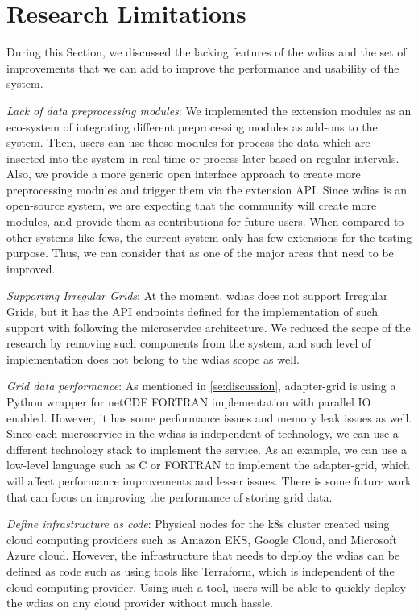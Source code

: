 \section{Research Limitations}
\label{se:research_limitations}

During this Section, we discussed the lacking features of the \acrshort{wdias} and the set of improvements that we can add to improve the performance and usability of the system.

\emph{Lack of data preprocessing modules}:
We implemented the extension modules as an eco-system of integrating different preprocessing modules as add-ons to the system. Then, users can use these modules for process the data which are inserted into the system in real time or process later based on regular intervals. Also, we provide a more generic open interface approach to create more preprocessing modules and trigger them via the extension API. Since \acrshort{wdias} is an open-source system, we are expecting that the community will create more modules, and provide them as contributions for future users. When compared to other systems like \acrshort{fews}, the current system only has few extensions for the testing purpose. Thus, we can consider that as one of the major areas that need to be improved.

\emph{Supporting Irregular Grids}:
At the moment, \acrshort{wdias} does not support Irregular Grids, but it has the API endpoints defined for the implementation of such support with following the microservice architecture. We reduced the scope of the research by removing such components from the system, and such level of implementation does not belong to the \acrshort{wdias} scope as well.

\emph{Grid data performance}:
As mentioned in \cref{se:discussion}, adapter-grid is using a Python wrapper for netCDF FORTRAN implementation with parallel IO enabled. However, it has some performance issues and memory leak issues as well. Since each microservice in the \acrshort{wdias} is independent of technology, we can use a different technology stack to implement the service. As an example, we can use a low-level language such as C or FORTRAN to implement the adapter-grid, which will affect performance improvements and lesser issues. There is some future work that can focus on improving the performance of storing grid data.

\emph{Define infrastructure as code}:
Physical nodes for the \acrshort{k8s} cluster created using cloud computing providers such as Amazon EKS, Google Cloud, and Microsoft Azure cloud. However, the infrastructure that needs to deploy the \acrshort{wdias} can be defined as code such as using tools like Terraform, which is independent of the cloud computing provider. Using such a tool, users will be able to quickly deploy the \acrshort{wdias} on any cloud provider without much hassle.

